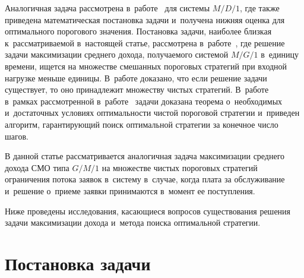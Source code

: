 \begin{multicols}{2}
Аналогичная 
задача рассмотрена в~работе~\cite{6-aga} для сис\-те\-мы $M/D/1$, где также 
приведена математическая постановка задачи и~получена нижняя оценка для 
оптимального порогового значения. Постановка задачи, наиболее близкая 
к~рас\-смат\-ри\-ва\-емой в~настоящей статье, рассмотрена в~работе~\cite{7-aga}, где 
решение задачи максимизации среднего дохода, получаемого системой 
$M/G/1$ в~единицу времени, ищется на множестве смешанных пороговых 
стратегий при входной нагрузке меньше единицы. В~работе доказано, что если 
решение задачи существует, то оно принадлежит множеству чистых стратегий. 
В~работе~\cite{8-aga} в~рамках рассмотренной в~работе~\cite{7-aga} задачи 
доказана теорема о~необходимых и~достаточных условиях оптимальности 
чистой пороговой стратегии и~приведен алгоритм, гарантирующий поиск 
оптимальной стратегии за конечное число шагов. 
  
  В данной статье рассматривается аналогичная задача максимизации среднего 
дохода СМО типа $G/M/1$ на множестве чистых пороговых стратегий 
ограничения потока заявок в~систему в~случае, когда плата за обслуживание 
и~решение о~приеме заявки принимаются в~момент ее поступления. 

Ниже 
проведены исследования, касающиеся вопросов существования решения задачи 
максимизации дохода и~метода поиска оптимальной стра\-тегии.

\vspace*{-6pt}
  
  \section{Постановка задачи}
  
  \vspace*{-2pt}
  

\end{multicols}
